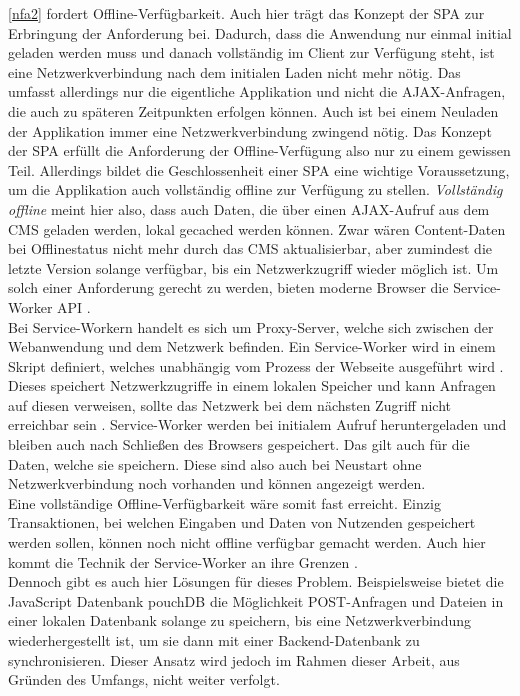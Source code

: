 \ref{nfa2} fordert Offline-Verfügbarkeit. Auch hier trägt das Konzept der SPA zur 
Erbringung der Anforderung bei. Dadurch, dass die Anwendung nur einmal initial geladen werden muss 
und danach vollständig im Client zur Verfügung steht, ist eine Netzwerkverbindung nach dem initialen 
Laden nicht mehr nötig. Das umfasst allerdings nur die eigentliche Applikation und nicht die
AJAX-Anfragen, die auch zu späteren Zeitpunkten erfolgen können. Auch ist bei einem Neuladen
der Applikation immer eine Netzwerkverbindung zwingend nötig. Das Konzept der SPA erfüllt
die Anforderung der Offline-Verfügung also nur zu einem gewissen Teil. Allerdings bildet die Geschlossenheit
einer SPA eine wichtige Voraussetzung, um die Applikation auch vollständig offline zur Verfügung
zu stellen. \emph{Vollständig offline} meint hier also, dass auch Daten, die über
einen AJAX-Aufruf aus dem CMS geladen werden, lokal gecached werden können. Zwar wären Content-Daten bei
Offlinestatus nicht mehr durch das CMS aktualisierbar, aber zumindest die letzte Version solange verfügbar,
bis ein Netzwerkzugriff wieder möglich ist. Um solch einer Anforderung gerecht zu werden, bieten moderne 
Browser die Service-Worker API \cite{service-worker-api}.\\ 
Bei Service-Workern handelt es sich um Proxy-Server, welche sich zwischen der Webanwendung und dem 
Netzwerk befinden. Ein Service-Worker wird in einem Skript definiert, welches
unabhängig vom Prozess der Webseite ausgeführt wird \cite{service-worker-intro}. 
Dieses speichert Netzwerkzugriffe in einem lokalen Speicher und kann Anfragen auf
diesen verweisen, sollte das Netzwerk bei dem nächsten Zugriff nicht erreichbar sein \cite{service-worker-api}.
Service-Worker werden bei initialem Aufruf heruntergeladen und bleiben auch nach Schließen des Browsers
gespeichert. Das gilt auch für die Daten, welche sie speichern. Diese sind also auch bei Neustart ohne
Netzwerkverbindung noch vorhanden und können angezeigt werden.\\
Eine vollständige Offline-Verfügbarkeit wäre somit fast erreicht. Einzig Transaktionen, bei welchen Eingaben
und Daten von Nutzenden gespeichert werden sollen, können noch nicht offline verfügbar gemacht werden.
Auch hier kommt die Technik der Service-Worker an ihre Grenzen \cite{service-worker-post}.\\
Dennoch gibt es auch hier Lösungen für dieses
Problem. Beispielsweise bietet die JavaScript Datenbank pouchDB \cite{pouchdb} die Möglichkeit POST-Anfragen
und Dateien in einer lokalen Datenbank solange zu speichern, bis eine Netzwerkverbindung wiederhergestellt ist,
um sie dann mit einer Backend-Datenbank zu synchronisieren. Dieser Ansatz wird jedoch im Rahmen dieser Arbeit,
aus Gründen des Umfangs, nicht weiter verfolgt.\\

